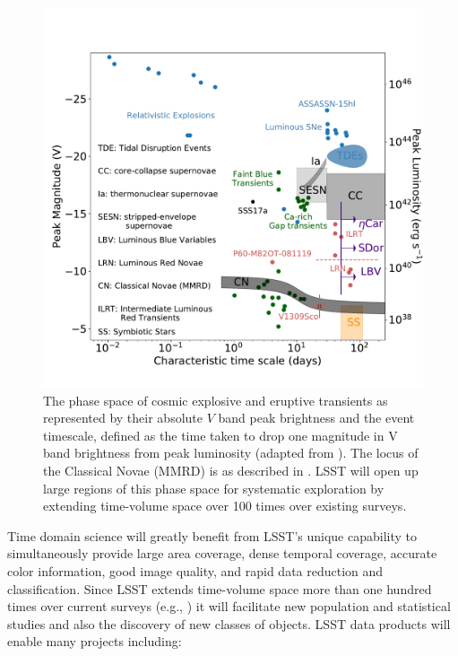 \begin{figure}
\hskip -0.1in
\vskip -0.1in
\includegraphics[width=1.0\hsize,clip]{taumv_updated.pdf}
\caption{The phase space of cosmic explosive and eruptive transients
  as represented by their absolute $V$ band peak brightness and the
  event timescale, defined as the time taken to drop one magnitude in
  V band brightness from peak luminosity (adapted from \cite{2007Natur.447..458K}
  \cite{2011PhDT........35K}).  The locus of the Classical
  Novae (MMRD) is as described in \cite{DellaValle1995}.  LSST
  will open up large regions of this phase space for systematic
  exploration by extending time-volume space over 100 times over
  existing surveys.}
\label{Fig:shri}
\end{figure}

Time domain science will greatly benefit from LSST's unique capability
to simultaneously provide large area coverage, dense temporal
coverage, accurate color information, good image quality, and rapid
data reduction and classification. Since LSST extends time-volume
space more than one hundred times over current surveys (e.g., \cite{2008ApJ...676..163M})
it will facilitate new population and statistical studies and also the discovery of new classes of
objects.  LSST data products will enable many projects including:

